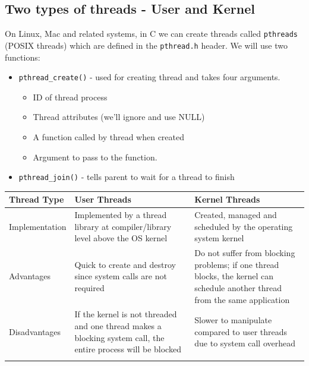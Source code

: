 \documentclass[a4paper, 10pt]{article}
\begin{document}
\subsection{Two types of threads - User and Kernel}

On Linux, Mac and related systems, in C we can create threads called \texttt{pthreads} (POSIX threads) which are defined in the \texttt{pthread.h} header. We will use two functions:
\begin{itemize}
    \item \texttt{pthread\_create()} - used for creating thread and takes four arguments.
          \begin{itemize}
              \item ID of thread process
              \item Thread attributes (we'll ignore and use NULL)
              \item A function called by thread when created
              \item Argument to pass to the function.
          \end{itemize}
    \item \texttt{pthread\_join()} - tells parent to wait for a thread to finish
\end{itemize}

\begin{table}[h!]
    \centering
    \begin{tabularx}{\textwidth}{@{} l X X @{}}
        \toprule
        Thread Type    & User Threads                                                                                                  & Kernel Threads                                                                                                               \\
        \midrule
        Implementation & Implemented by a thread library at compiler/library level above the OS kernel                                 & Created, managed and scheduled by the operating system kernel                                                                \\
        Advantages     & Quick to create and destroy since system calls are not required                                               & Do not suffer from blocking problems; if one thread blocks, the kernel can schedule another thread from the same application \\
        Disadvantages  & If the kernel is not threaded and one thread makes a blocking system call, the entire process will be blocked & Slower to manipulate compared to user threads due to system call overhead                                                    \\
        \addlinespace[2ex]
        \bottomrule
    \end{tabularx}
\end{table}
\end{document}
